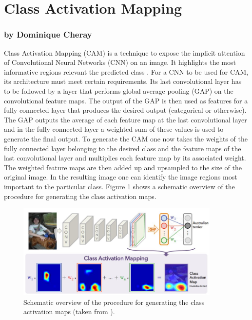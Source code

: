 \documentclass[11pt]{report}
\begin{document}
\section {Class Activation Mapping}
\label{CAM}
\subsubsection{by Dominique Cheray}
Class Activation Mapping (CAM) is a technique to expose the implicit attention
of Convolutional Neural Networks (CNN) on an image. It highlights the most
informative regions relevant the predicted class \cite{zhou2016learning}. For a
CNN to be used for CAM, its architecture must meet certain requirements. Its
last convolutional layer has to be followed by a layer that performs global
average pooling (GAP) on the convolutional feature maps. The output of the GAP
is then used as features for a fully connected layer that produces the desired
output (categorical or otherwise). \\
The GAP outputs the average of each feature map at the last convolutional layer
and in the fully connected layer a weighted sum of these values is used to
generate the final output. To generate the CAM one now takes the weights of the
fully connected layer belonging to the desired class and the feature maps of the
last convolutional layer and multiplies each feature map by its associated
weight. The weighted feature maps are then added up and upsampled to the size of
the original image. In the resulting image one can identify the image regions
most important to the particular class. Figure \ref{SchematicCAM} shows a
schematic overview of the procedure for generating the class activation maps.
\begin{figure}
  \centering
  \includegraphics[width=0.9\textwidth]{CAM_graphik}
  \caption{Schematic overview of the procedure for generating the class activation maps (taken from
    \cite{zhou2016learning}).}
  \label{SchematicCAM}
\end{figure}
\end{document}
